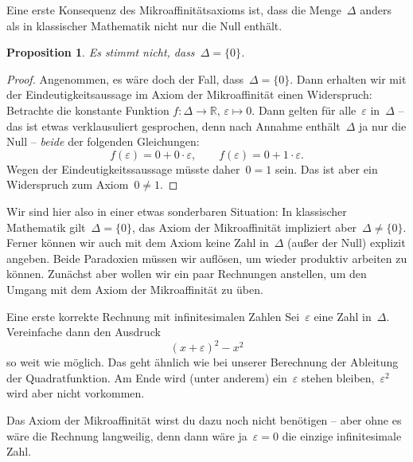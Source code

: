 \documentclass[twoside]{../zirkelblatt}
\newcommand{\RR}{\mathbb{R}}
\theoremstyle{definition}
\theoremstyle{plain}
\newtheorem{prop}[defn]{Proposition}
\theoremstyle{remark}
\begin{document}
Eine erste Konsequenz des Mikroaffinitätsaxioms ist, dass die Menge~$\Delta$
anders als in klassischer Mathematik nicht nur die Null enthält.
\begin{prop}\label{prop:neg-delta0}Es stimmt nicht, dass~$\Delta = \{ 0 \}$.\end{prop}
\begin{proof}Angenommen, es wäre doch der Fall, dass~$\Delta = \{ 0 \}$. Dann
erhalten wir mit der Eindeutigkeitsaussage im Axiom der Mikroaffinität einen
Widerspruch: Betrachte die konstante Funktion $f : \Delta \to \RR,\,\varepsilon \mapsto 0$.
Dann gelten für alle~$\varepsilon$ in~$\Delta$ -- das ist etwas verklausuliert
gesprochen, denn nach Annahme enthält~$\Delta$ ja nur die Null -- \emph{beide}
der folgenden Gleichungen:
\[
  f(\varepsilon) = 0 + 0 \cdot \varepsilon, \qquad
  f(\varepsilon) = 0 + 1 \cdot \varepsilon. \]
Wegen der Eindeutigkeitssaussage müsste daher~$0 = 1$ sein. Das ist aber ein
Widerspruch zum Axiom~$0 \neq 1$.
\end{proof}

Wir\marginpar[\hfill\dbend]{\dbend} sind hier also in einer etwas sonderbaren Situation: In klassischer
Mathematik gilt~$\Delta = \{ 0 \}$, das Axiom der Mikroaffinität impliziert
aber~$\Delta \neq \{ 0 \}$. Ferner können wir auch mit dem Axiom keine Zahl
in~$\Delta$ (außer der Null) explizit angeben. Beide Paradoxien müssen wir
auflösen, um wieder produktiv arbeiten zu können. Zunächst aber wollen wir ein
paar Rechnungen anstellen, um den Umgang mit dem Axiom der Mikroaffinität zu
üben.

\begin{aufgabeShaded}{Eine erste korrekte Rechnung mit infinitesimalen Zahlen}
\label{aufg:erste-rechnung}
Sei~$\varepsilon$ eine Zahl in~$\Delta$. Vereinfache dann den Ausdruck
\[ (x + \varepsilon)^2 - x^2 \]
so weit wie möglich. Das geht ähnlich wie bei unserer Berechnung der Ableitung
der Quadratfunktion. Am Ende wird (unter anderem) ein~$\varepsilon$ stehen
bleiben,~$\varepsilon^2$ wird aber nicht vorkommen.

Das Axiom der Mikroaffinität wirst du dazu noch nicht benötigen -- aber ohne es
wäre die Rechnung langweilig, denn dann wäre ja~$\varepsilon = 0$ die einzige
infinitesimale Zahl.
\end{aufgabeShaded}
\end{document}
